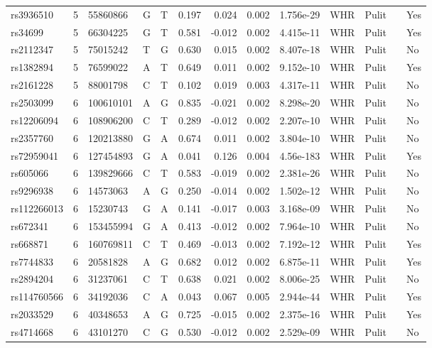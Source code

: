 \documentclass[11pt,twoside]{bristolthesis}
\begin{document}
\begin{longtable}[t]{lrlllrrrlllll}
rs3936510 & 5 & 55860866 & G & T & 0.197 & 0.024 & 0.002 & 1.756e-29 & WHR & Pulit &  & Yes\\
rs34699 & 5 & 66304225 & G & T & 0.581 & -0.012 & 0.002 & 4.415e-11 & WHR & Pulit &  & Yes\\
\addlinespace
rs2112347 & 5 & 75015242 & T & G & 0.630 & 0.015 & 0.002 & 8.407e-18 & WHR & Pulit &  & No\\
rs1382894 & 5 & 76599022 & A & T & 0.649 & 0.011 & 0.002 & 9.152e-10 & WHR & Pulit &  & Yes\\
rs2161228 & 5 & 88001798 & C & T & 0.102 & 0.019 & 0.003 & 4.317e-11 & WHR & Pulit &  & No\\
rs2503099 & 6 & 100610101 & A & G & 0.835 & -0.021 & 0.002 & 8.298e-20 & WHR & Pulit &  & No\\
rs12206094 & 6 & 108906200 & C & T & 0.289 & -0.012 & 0.002 & 2.207e-10 & WHR & Pulit &  & No\\
\addlinespace
rs2357760 & 6 & 120213880 & G & A & 0.674 & 0.011 & 0.002 & 3.804e-10 & WHR & Pulit &  & No\\
rs72959041 & 6 & 127454893 & G & A & 0.041 & 0.126 & 0.004 & 4.56e-183 & WHR & Pulit &  & Yes\\
rs605066 & 6 & 139829666 & C & T & 0.583 & -0.019 & 0.002 & 2.381e-26 & WHR & Pulit &  & No\\
rs9296938 & 6 & 14573063 & A & G & 0.250 & -0.014 & 0.002 & 1.502e-12 & WHR & Pulit &  & No\\
rs112266013 & 6 & 15230743 & G & A & 0.141 & -0.017 & 0.003 & 3.168e-09 & WHR & Pulit &  & No\\
\addlinespace
rs672341 & 6 & 153455994 & G & A & 0.413 & -0.012 & 0.002 & 7.964e-10 & WHR & Pulit &  & No\\
rs668871 & 6 & 160769811 & C & T & 0.469 & -0.013 & 0.002 & 7.192e-12 & WHR & Pulit &  & Yes\\
rs7744833 & 6 & 20581828 & A & G & 0.682 & 0.012 & 0.002 & 6.875e-11 & WHR & Pulit &  & Yes\\
rs2894204 & 6 & 31237061 & C & T & 0.638 & 0.021 & 0.002 & 8.006e-25 & WHR & Pulit &  & No\\
rs114760566 & 6 & 34192036 & C & A & 0.043 & 0.067 & 0.005 & 2.944e-44 & WHR & Pulit &  & Yes\\
\addlinespace
rs2033529 & 6 & 40348653 & A & G & 0.725 & -0.015 & 0.002 & 2.375e-16 & WHR & Pulit &  & Yes\\
rs4714668 & 6 & 43101270 & C & G & 0.530 & -0.012 & 0.002 & 2.529e-09 & WHR & Pulit &  & No\\

\end{longtable}
\end{document}
